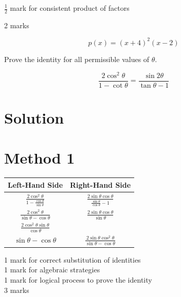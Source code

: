 \documentclass[10pt]{article}
\begin{document}
$\frac{1}{2}$ mark for consistent product of factors

2 marks

$$
p(x)=(x+4)^{2}(x-2)
$$

Prove the identity for all permissible values of $\theta$.

$$
\frac{2 \cos ^{2} \theta}{1-\cot \theta}=\frac{\sin 2 \theta}{\tan \theta-1}
$$

\section*{Solution}
\section*{Method 1}
\begin{center}
\begin{tabular}{c|c}
Left-Hand Side & Right-Hand Side \\
\hline
$\frac{2 \cos ^{2} \theta}{1-\frac{\cos \theta}{\sin \theta}}$ & $\frac{2 \sin \theta \cos \theta}{\frac{\sin \theta}{\cos \theta}-1}$ \\
$\frac{2 \cos ^{2} \theta}{\sin \theta-\cos \theta}$ & $\frac{2 \sin \theta \cos \theta}{\sin \theta}$ \\
$\frac{2 \cos ^{2} \theta \sin \theta}{\cos \theta}$ &  \\
$\sin \theta-\cos \theta$ & $\frac{2 \sin \theta \cos ^{2} \theta}{\sin \theta-\cos \theta}$ \\
\end{tabular}
\end{center}

1 mark for correct substitution of identities\\
1 mark for algebraic strategies\\
1 mark for logical process to prove the identity\\
3 marks
\end{document}
